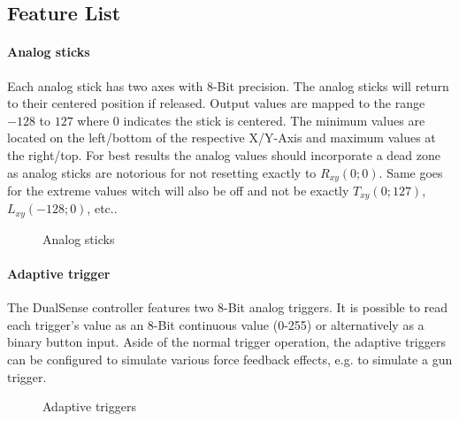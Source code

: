 \subsection{Feature List}

\paragraph{Analog sticks}
Each analog stick has two axes with 8-Bit precision. The analog sticks will return to their centered position if released. Output values are mapped to the range $-128$ to $127$ where $0$ indicates the stick is centered. The minimum values are located on the left/bottom of the respective X/Y-Axis and maximum values at the right/top. For best results the analog values should incorporate a dead zone as analog sticks are notorious for not resetting exactly to $R_{xy}(0; 0)$. Same goes for the extreme values witch will also be off and not be exactly $T_{xy}(0; 127)$, $L_{xy}(-128; 0)$, etc..
\begin{figure}[H]
    \centering
    \caption{Analog sticks}
\end{figure}

\paragraph{Adaptive trigger}
The DualSense controller features two 8-Bit analog triggers. It is possible to read each trigger's value as an 8-Bit continuous value (0-255) or alternatively as a binary button input. Aside of the normal trigger operation, the adaptive triggers can be configured to simulate various force feedback effects, e.g. to simulate a gun trigger.
\begin{figure}[H]
    \centering
    \caption{Adaptive triggers}
\end{figure}

